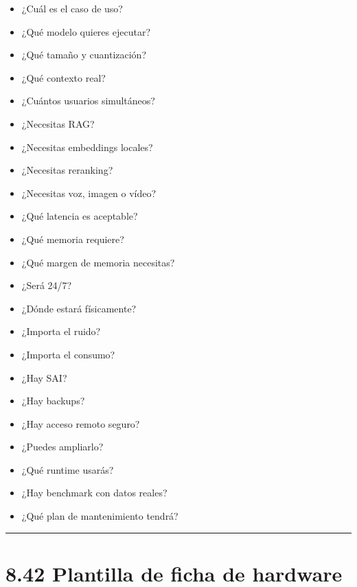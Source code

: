 \begin{itemize}
\tightlist
\item
  ¿Cuál es el caso de uso?
\item
  ¿Qué modelo quieres ejecutar?
\item
  ¿Qué tamaño y cuantización?
\item
  ¿Qué contexto real?
\item
  ¿Cuántos usuarios simultáneos?
\item
  ¿Necesitas RAG?
\item
  ¿Necesitas embeddings locales?
\item
  ¿Necesitas reranking?
\item
  ¿Necesitas voz, imagen o vídeo?
\item
  ¿Qué latencia es aceptable?
\item
  ¿Qué memoria requiere?
\item
  ¿Qué margen de memoria necesitas?
\item
  ¿Será 24/7?
\item
  ¿Dónde estará físicamente?
\item
  ¿Importa el ruido?
\item
  ¿Importa el consumo?
\item
  ¿Hay SAI?
\item
  ¿Hay backups?
\item
  ¿Hay acceso remoto seguro?
\item
  ¿Puedes ampliarlo?
\item
  ¿Qué runtime usarás?
\item
  ¿Hay benchmark con datos reales?
\item
  ¿Qué plan de mantenimiento tendrá?
\end{itemize}

\begin{center}\rule{0.5\linewidth}{0.5pt}\end{center}

\section{8.42 Plantilla de ficha de
hardware}\label{plantilla-de-ficha-de-hardware}

